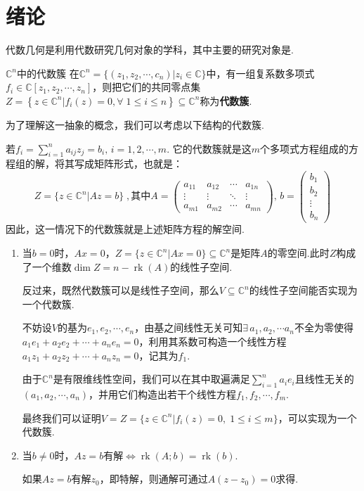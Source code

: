 \chapter{绪论}

代数几何是利用代数研究几何对象的学科，其中主要的研究对象是.
\begin{definition}{$\mathbb{C}^n$中的代数簇}
    在$\mathbb{C}^n=\{(z_1,z_2,\cdots,c_n)|z_i\in\mathbb{C}\}$中，有一组复系数多项式$f_i\in\mathbb{C}[z_1,z_2,\cdots,z_n]$，则把它们的共同零点集$Z=\left\{z\in\mathbb{C}^n|f_i(z)=0,\forall\;1\leqslant i \leqslant n\right\}\subseteq \mathbb{C}^n$称为\textbf{代数簇}.
\end{definition}
为了理解这一抽象的概念，我们可以考虑以下结构的代数簇.\par
\begin{instance}
    若$f_i=\sum_{i=1}^n{a_{ij}z_j}=b_i,\,i=1,2,\cdots,m$.
    它的代数簇就是这$m$个多项式方程组成的方程组的解，将其写成矩阵形式，也就是：
    \[
    Z=\{z\in\mathbb{C}^n|Az=b\}\;,\text{其中}A=\begin{pmatrix}
        a_{11} & a_{12} & \cdots & a_{1n} \\
        \vdots & \vdots & \ddots & \vdots \\
        a_{m1} & a_{m2} & \cdots & a_{mn} 
    \end{pmatrix},\,b=\begin{pmatrix}
        b_1 \\
        b_2 \\
        \vdots \\
        b_n
    \end{pmatrix}
    \]
    因此，这一情况下的代数簇就是上述矩阵方程的解空间.\par
    \begin{enumerate}[label=case\;\arabic*]
        \item 当$b=0$时，$Ax=0$，$Z=\{z\in\mathbb{C}^n| Ax=0\}\subseteq\mathbb{C}^n$是矩阵$A$的零空间.此时$Z$构成了一个维数$\operatorname{dim}Z=n-\operatorname{rk}(A)$的线性子空间.\par
        反过来，既然代数簇可以是线性子空间，那么$V\subseteq \mathbb{C}^n$的线性子空间能否实现为一个代数簇.\par
        不妨设$V$的基为$e_1,e_2,\cdots,e_n$，由基之间线性无关可知$\exists\,a_1,a_2,\cdots a_n\text{不全为零}$使得$a_1e_1+a_2e_2+\cdots+a_ne_n=0$，利用其系数可构造一个线性方程$a_1z_1+a_2z_2+\cdots+a_nz_n=0$，记其为$f_1$.\par
        由于$\mathbb{C}^n$是有限维线性空间，我们可以在其中取遍满足$\sum_{i=1}^n{a_ie_i}$且线性无关的$(a_1,a_2,\cdots,a_n)$，并用它们构造出若干个线性方程$f_1,f_2,\cdots,f_m$.\par
        最终我们可以证明$V=Z=\{z\in\mathbb{C}^n|f_i(z)=0,\;1\leqslant i\leqslant m\}$，可以实现为一个代数簇.
        \item 当$b\neq 0$时，$Az=b$有解$\Leftrightarrow \operatorname{rk}(A;b)=\operatorname{rk}(b)$.\par
        如果$Az=b$有解$z_0$，即特解，则通解可通过$A(z-z_0) =0$求得.\par
    \end{enumerate}
\end{instance}

